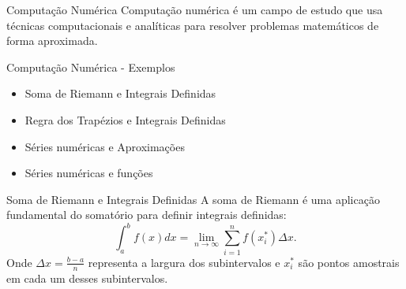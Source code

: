 \documentclass{beamer}
\begin{document}
\begin{frame}{Computação Numérica}
    Computação numérica é um campo de estudo que usa técnicas computacionais e analíticas para resolver problemas matemáticos de forma aproximada. 
\end{frame}

\begin{frame}{Computação Numérica - Exemplos}
    \begin{itemize}
        \item Soma de Riemann e Integrais Definidas
        \item Regra dos Trapézios e Integrais Definidas
        \item Séries numéricas e Aproximações
        \item Séries numéricas e funções
    \end{itemize}
\end{frame}


\begin{frame}{Soma de Riemann e Integrais Definidas}
    A soma de Riemann é uma aplicação fundamental do somatório para definir integrais definidas:
    \[
        \int_{a}^{b} f(x) dx = \lim_{n \to \infty} \sum_{i=1}^{n} f(x_i^*) \Delta x.
    \]
    Onde \( \Delta x = \displaystyle \frac{b-a}{n} \) representa a largura dos subintervalos e $x_i^*$ são pontos amostrais em cada um desses subintervalos.
\end{frame}
\end{document}
